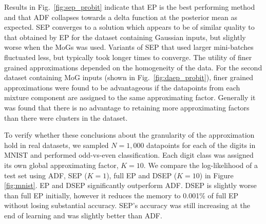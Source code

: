 
Results in Fig.~\ref{fig:sep_probit} indicate that EP is the best performing method and that ADF collapses towards a delta function at the posterior mean as expected. SEP converges to a solution which appears to be of similar quality to that obtained by EP for the dataset containing Gaussian inputs, but slightly worse when the MoGs was used. Variants of SEP that used larger mini-batches fluctuated less, but typically took longer times to converge.
The utility of finer grained approximations depended on the homogeneity of the data. For the second dataset containing MoG inputs (shown in Fig.~\ref{fig:daep_probit}), finer grained approximations were found to be advantageous if the datapoints from each mixture component are assigned to the same approximating factor. Generally it was found that there is no advantage to retaining more approximating factors than there were clusters in the dataset.  


To verify whether these conclusions about the granularity of the approximation hold in real datasets, we sampled $N=1,000$ datapoints for each of the digits in MNIST and performed odd-vs-even classification. Each digit class was assigned its own global approximating factor, $K=10$. We compare the log-likelihood of a test set using ADF, SEP ($K=1$), full EP and DSEP ($K=10$) in Figure \ref{fig:mnist}. EP and DSEP significantly outperform ADF. DSEP is slightly worse than full EP initially, however it reduces the memory to 0.001\% of full EP without losing substantial accuracy. SEP's accuracy was still increasing at the end of learning and was slightly better than ADF.

